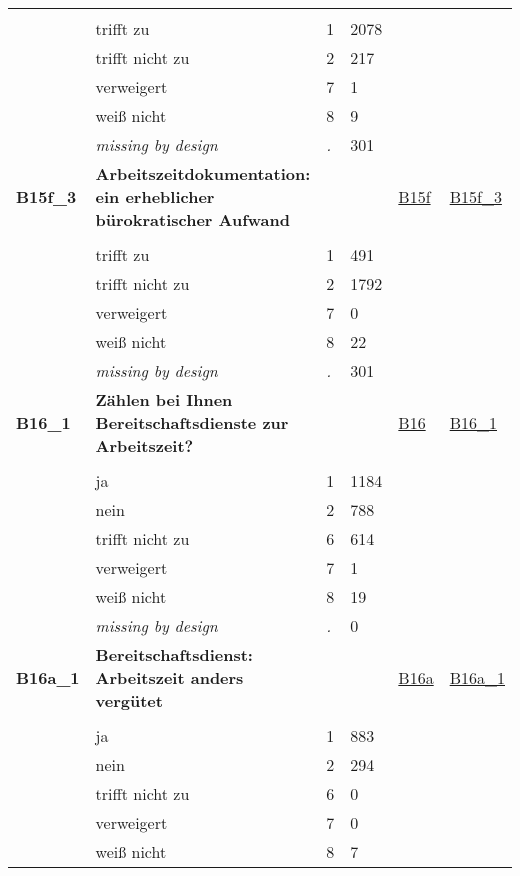 \begin{longtable}{| L{2.45cm} | L{6cm} | C{1.5cm} | R{1cm} | C{2.25cm} | C{2.25cm} |}
   &  &  &  &  &  \\ 
   & trifft zu & 1 & 2078 &  &  \\ 
   & trifft nicht zu & 2 & 217 &  &  \\ 
   & verweigert & 7 & 1 &  &  \\ 
   & weiß nicht & 8 & 9 &  &  \\ 
   & \textit{missing by design} & \textit{.} & 301 &  &  \\ 
   \midrule
\textbf{B15f\_3}\label{var:B15f:3} & \textbf{Arbeitszeitdokumentation: ein erheblicher bürokratischer Aufwand} &  &  & \hyperref[B15f]{B15f} & \hyperref[var:suf:B15f:3]{B15f\_3} \\ 
   &  &  &  &  &  \\ 
   & trifft zu & 1 & 491 &  &  \\ 
   & trifft nicht zu & 2 & 1792 &  &  \\ 
   & verweigert & 7 & 0 &  &  \\ 
   & weiß nicht & 8 & 22 &  &  \\ 
   & \textit{missing by design} & \textit{.} & 301 &  &  \\ 
   \midrule
\textbf{B16\_1}\label{var:B16:1} & \textbf{Zählen bei Ihnen Bereitschaftsdienste zur Arbeitszeit?} &  &  & \hyperref[B16]{B16} & \hyperref[var:suf:B16:1]{B16\_1} \\ 
   &  &  &  &  &  \\ 
   & ja & 1 & 1184 &  &  \\ 
   & nein & 2 & 788 &  &  \\ 
   & trifft nicht zu & 6 & 614 &  &  \\ 
   & verweigert & 7 & 1 &  &  \\ 
   & weiß nicht & 8 & 19 &  &  \\ 
   & \textit{missing by design} & \textit{.} & 0 &  &  \\ 
   \midrule
\textbf{B16a\_1}\label{var:B16a:1} & \textbf{Bereitschaftsdienst: Arbeitszeit anders vergütet} &  &  & \hyperref[B16a]{B16a} & \hyperref[var:suf:B16a:1]{B16a\_1} \\ 
   &  &  &  &  &  \\ 
   & ja & 1 & 883 &  &  \\ 
   & nein & 2 & 294 &  &  \\ 
   & trifft nicht zu & 6 & 0 &  &  \\ 
   & verweigert & 7 & 0 &  &  \\ 
   & weiß nicht & 8 & 7 &  &  \\ 

\end{longtable}
